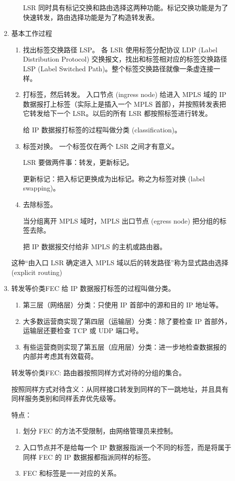 \documentclass[11pt]{article}
\begin{document}
\begin{enumerate}
\begin{enumerate}
\begin{enumerate}
LSR 同时具有标记交换和路由选择这两种功能。标记交换功能是为了快速转发，路由选择功能是为了构造转发表。
\end{enumerate}
\item 基本工作过程
\label{sec:org4bdefaf}
\begin{enumerate}
\item 找出标签交换路径 LSP。
各 LSR 使用标签分配协议 LDP (Label Distribution Protocol) 交换报文，找出和标签相对应的标签交换路径 LSP (Label Switched Path)。整个标签交换路径就像一条虚连接一样。
\item 打标签，然后转发。
入口节点 (ingress node) 给进入 MPLS 域的 IP 数据报打上标签（实际上是插入一个 MPLS 首部），并按照转发表把它转发给下一个 LSR。以后的所有 LSR 都按照标签进行转发。

给 IP 数据报打标签的过程叫做分类 (classification)。
\item 标签对换。
一个标签仅在两个 LSR 之间才有意义。

LSR 要做两件事：转发，更新标记。

更新标记：把入标记更换成为出标记。称之为标签对换 (label swapping)。
\item 去除标签。

当分组离开 MPLS 域时，MPLS 出口节点 (egress node) 把分组的标签去除。

把 IP 数据报交付给非 MPLS 的主机或路由器。
\end{enumerate}
这种“由入口 LSR 确定进入 MPLS 域以后的转发路径”称为显式路由选择 (explicit routing)
\item 转发等价类FEC
\label{sec:orgbd692d8}
给 IP 数据报打标签的过程叫做分类。
\begin{enumerate}
\item 第三层（网络层）分类：只使用 IP 首部中的源和目的 IP 地址等。
\item 大多数运营商实现了第四层（运输层）分类：除了要检查 IP 首部外，运输层还要检查 TCP 或 UDP 端口号。
\item 有些运营商则实现了第五层（应用层）分类：进一步地检查数据报的内部并考虑其有效载荷。
\end{enumerate}

转发等价类FEC: 路由器按照同样方式对待的分组的集合。

按照同样方式对待含义：从同样接口转发到同样的下一跳地址，并且具有同样服务类别和同样丢弃优先级等。

特点：
\begin{enumerate}
\item 划分 FEC 的方法不受限制，由网络管理员来控制。
\item 入口节点并不是给每一个 IP 数据报指派一个不同的标签，而是将属于同样 FEC 的 IP 数据报都指派同样的标签。
\item FEC 和标签是一一对应的关系。
\end{enumerate}
\end{enumerate}
\end{enumerate}
\end{document}
